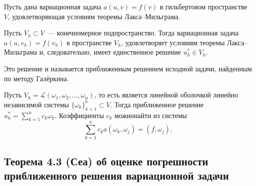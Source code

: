 \documentclass[a4paper,14pt]{article} %
\begin{document}
Пусть дана вариационная задача $a(u, v) = f (v)$ в гильбертовом пространстве $V$,
удовлетворяющая условиям теоремы Лакса--Мильграма.

Пусть $V_h\subset V$~--- конечномерное подпространство.
Тогда вариационная задача $a(u, v_h) = f (v_h)$ в пространстве $V_h$,
удовлетворяет условиям теоремы Лакса--Мильграма и, следовательно,
имеет единственное решение $u_h^*\in V_h$.

Это решение и называется приближенным решением исходной задачи,
найденным по методу Галёркина.

Пусть $V_h = \mathcal{L} (\omega_1 , \omega_2 , ... , \omega_n )$,
то есть является линейной оболочкой линейно независимой системы
$\{\omega_k \}_{k=1}^b \subset V$.
Тогда приближенное решение $u^*_h = \sum_{k=1}^n c_k \omega_k$.
Коэффициенты $c_k$ можнонайти из системы
\begin{equation}
	\sum_{k=1}^n c_k a(\omega_k, \omega_j) = (f, \omega_j)
	.
\end{equation}


\subsection{Теорема 4.3 (Сеа) об оценке погрешности приближенного решения вариационной задачи}
\end{document}

